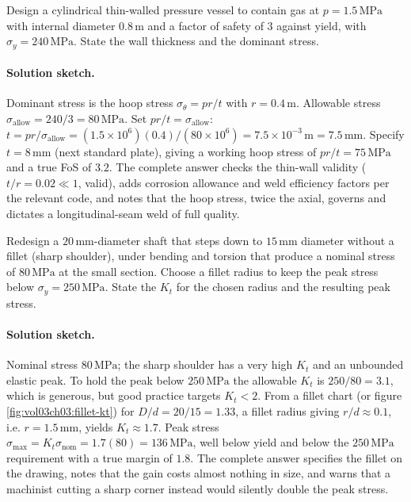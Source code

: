 \begin{exercise}
Design a cylindrical thin-walled pressure vessel to contain gas at
$p = 1.5\,\text{MPa}$ with internal diameter $0.8\,\si{\meter}$ and a
factor of safety of $3$ against yield, with $\sigma_y = 240\,\text{
MPa}$. State the wall thickness and the dominant stress.
\paragraph{Solution sketch.} Dominant stress is the hoop stress
$\sigma_{\theta} = pr/t$ with $r = 0.4\,\si{\meter}$. Allowable stress
$\sigma_{\text{allow}} = 240/3 = 80\,\text{MPa}$. Set $pr/t =
\sigma_{\text{allow}}$: $t = pr/\sigma_{\text{allow}} = (1.5\times 10^6)
(0.4)/(80\times 10^6) = 7.5\times 10^{-3}\,\si{\meter} = 7.5\,\si{\milli
\meter}$. Specify $t = 8\,\si{\milli\meter}$ (next standard plate),
giving a working hoop stress of $pr/t = 75\,\text{MPa}$ and a true FoS
of $3.2$. The complete answer checks the thin-wall validity ($t/r =
0.02 \ll 1$, valid), adds corrosion allowance and weld efficiency
factors per the relevant code, and notes that the hoop stress, twice
the axial, governs and dictates a longitudinal-seam weld of full
quality.
\end{exercise}

\begin{exercise}
Redesign a $20\,\si{\milli\meter}$-diameter shaft that steps down to
$15\,\si{\milli\meter}$ diameter without a fillet (sharp shoulder),
under bending and torsion that produce a nominal stress of $80\,
\text{MPa}$ at the small section. Choose a fillet radius to keep the
peak stress below $\sigma_y = 250\,\text{MPa}$. State the $K_t$ for
the chosen radius and the resulting peak stress.
\paragraph{Solution sketch.} Nominal stress $80\,\text{MPa}$; the
sharp shoulder has a very high $K_t$ and an unbounded elastic peak. To
hold the peak below $250\,\text{MPa}$ the allowable $K_t$ is $250/80 =
3.1$, which is generous, but good practice targets $K_t < 2$. From a
fillet chart (or figure \ref{fig:vol03ch03:fillet-kt}) for $D/d =
20/15 = 1.33$, a fillet radius giving $r/d \approx 0.1$, i.e. $r =
1.5\,\si{\milli\meter}$, yields $K_t \approx 1.7$. Peak stress
$\sigma_{\max} = K_t\sigma_{\text{nom}} = 1.7(80) = 136\,\text{MPa}$,
well below yield and below the $250\,\text{MPa}$ requirement with a true
margin of $1.8$. The complete answer specifies the fillet on the
drawing, notes that the gain costs almost nothing in size, and warns
that a machinist cutting a sharp corner instead would silently double
the peak stress.
\end{exercise}

